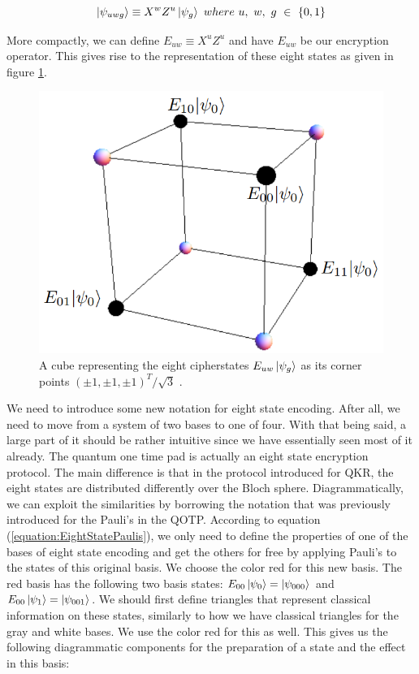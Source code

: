 \documentclass[]{article}
\begin{document}
\begin{equation}
	\label{equation:EightStatePaulis}
	\ket{\psi_{uwg}} \equiv X^w Z^u\ket{\psi_{g}}~where~ u,~ w,~ g~ \in~ \{0,1\}
\end{equation}

More compactly, we can define $E_{uw} \equiv X^u Z^u$ and have $E_{uw}$ be our encryption operator. This gives rise to the representation of these eight states as given in figure \ref{fig:eightstatecube}.

\begin{center}
\begin{figure}
	\begin{center}
	\includegraphics[width=0.5\linewidth]{Eightstatecube.png}
	\caption{A cube representing the eight cipherstates $E_{uw}\ket{\psi_{g}}$ as its corner points $(\pm1,\pm1,\pm1)^T/\sqrt{3}$ \cite{DeVries2016}.}
	\label{fig:eightstatecube}
	\end{center}
\end{figure}
\end{center}

We need to introduce some new notation for eight state encoding. After all, we need to move from a system of two bases to one of four. With that being said, a large part of it should be rather intuitive since we have essentially seen most of it already. The quantum one time pad is actually an eight state encryption protocol. The main difference is that in the protocol introduced for QKR, the eight states are distributed differently over the Bloch sphere. Diagrammatically, we can exploit the similarities by borrowing the notation that was previously introduced for the Pauli's in the QOTP. According to equation (\ref{equation:EightStatePaulis}), we only need to define the properties of one of the bases of eight state encoding and get the others for free by applying Pauli's to the states of this original basis. We choose the color red for this new basis. The red basis has the following two basis states: $E_{00}\ket{\psi_{0}} = \ket{\psi_{000}}$ and $E_{00}\ket{\psi_{1}} = \ket{\psi_{001}}$. We should first define triangles that represent classical information on these states, similarly to how we have classical triangles for the gray and white bases. We use the color red for this as well. This gives us the following diagrammatic components for the preparation of a state and the effect in this basis:
\end{document}
